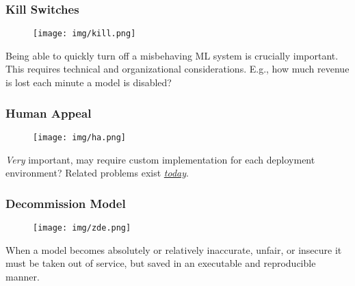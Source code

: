\documentclass[11pt,
               aspectratio=169,
               hyperref={colorlinks}
               ]{beamer}
\begin{document}
			\begin{frame}
	
				\frametitle{Kill Switches}	
				
				\begin{figure}[htb]
					\begin{center}
						\texttt{[image: img/kill.png]}
					\end{center}
				\end{figure}	
				
				\vspace{-10pt}
				\scriptsize{Being able to quickly turn off a misbehaving ML system is crucially important. This requires technical and organizational considerations. E.g., how much revenue is lost each minute a model is disabled?}	
				
				
			\end{frame}
	
			\begin{frame}	
			
				\frametitle{Human Appeal}		
				
				\begin{figure}[htb]
					\begin{center}
						\texttt{[image: img/ha.png]}
					\end{center}
				\end{figure}	
	
				\footnotesize{\textit{Very} important, may require custom implementation for each deployment environment? Related problems exist \href{https://www.nytimes.com/2017/06/13/opinion/how-computers-are-harming-criminal-justice.html}{\textit{today}}}.
	
			\end{frame}
	
			\begin{frame}	
				\frametitle{Decommission Model}		
				
				\begin{figure}[htb]
					\begin{center}
						\texttt{[image: img/zde.png]}
					\end{center}
				\end{figure}	
	
				\footnotesize{When a model becomes absolutely or relatively inaccurate, unfair, or insecure it must be taken out of service, but saved in an executable and reproducible manner.}
	
			\end{frame}
	
\end{document}
